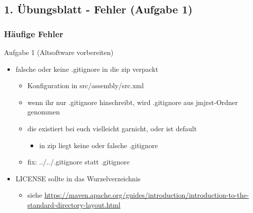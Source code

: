 \documentclass[18pt]{beamer}
\begin{document}
	\subsection{1. Übungsblatt - Fehler (Aufgabe 1)}
	\begin{frame}
		\frametitle{Häufige Fehler}
		\begin{block}{Aufgabe 1 (Altsoftware vorbereiten)}
		\begin{itemize}
			\item falsche oder keine .gitignore in die zip verpackt 
			\begin{itemize}
				\item Konfiguration in src/assembly/src.xml
				\item wenn ihr nur .gitignore hinschreibt, wird .gitignore aus jmjrst-Ordner genommen
				\item die existiert bei euch vielleicht garnicht, oder ist default
				\begin{itemize}
					\item in zip liegt keine oder falsche .gitignore
				\end{itemize}
				\item fix: ../../.gitignore statt .gitignore
			\end{itemize}
			\pause
			\item LICENSE sollte in das Wurzelverzeichnis
			\begin{itemize}
				\item siehe \url{https://maven.apache.org/guides/introduction/introduction-to-the-standard-directory-layout.html}
			\end{itemize}
		\end{itemize}
		\end{block}
	\end{frame}
	
\end{document}
